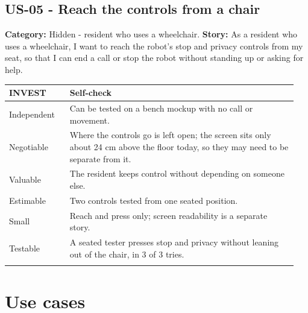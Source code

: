 \documentclass[12pt,letterpaper]{article}
\begin{document}
\par\medskip
\begin{minipage}{\linewidth}
\subsection*{US-05 - Reach the controls from a chair}

\textbf{Category:} Hidden - resident who uses a wheelchair. \textbf{Story:} As a resident who uses a wheelchair, I want to reach the robot's stop and privacy controls from my seat, so that I can end a call or stop the robot without standing up or asking for help.

\begingroup\small

\begin{tabular}{@{}>{\RaggedRight\arraybackslash}p{0.2\linewidth}>{\RaggedRight\arraybackslash}p{0.75\linewidth}@{}}

\toprule\textbf{INVEST} & \textbf{Self-check}\\\midrule

Independent & Can be tested on a bench mockup with no call or movement. \\ \addlinespace[3pt]

Negotiable & Where the controls go is left open; the screen sits only about 24 cm above the floor today, so they may need to be separate from it. \\ \addlinespace[3pt]

Valuable & The resident keeps control without depending on someone else. \\ \addlinespace[3pt]

Estimable & Two controls tested from one seated position. \\ \addlinespace[3pt]

Small & Reach and press only; screen readability is a separate story. \\ \addlinespace[3pt]

Testable & A seated tester presses stop and privacy without leaning out of the chair, in 3 of 3 tries. \\ \addlinespace[3pt]

\bottomrule
\end{tabular}

\endgroup
\end{minipage}
\par\medskip

\clearpage

\section{Use cases}
\end{document}
